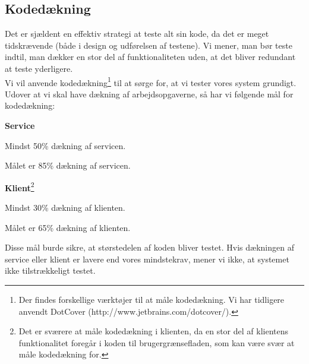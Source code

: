 \subsection{Kodedækning}
\label{Test_intendedStrat_coverage}
Det er sjældent en effektiv strategi at teste alt sin kode, da det er meget tidskrævende (både i design og udførelsen af testene). Vi mener, man bør teste indtil, man dækker en stor del af funktionaliteten uden, at det bliver redundant at teste yderligere. 
\\Vi vil anvende kodedækning\footnote{Der findes forskellige værktøjer til at måle kodedækning. Vi har tidligere anvendt DotCover (http://www.jetbrains.com/dotcover/).} til at sørge for, at vi tester vores system grundigt. Udover at vi skal have dækning af arbejdsopgaverne, så har vi følgende mål for kodedækning:
\begin{my_itemize}
\item \textbf{Service}
\item Mindst 50\% dækning af servicen.
\item Målet er 85\% dækning af servicen.
\item \textbf{Klient}\footnote{Det er sværere at måle kodedækning i klienten, da en stor del af klientens funktionalitet foregår i koden til brugergrænsefladen, som kan være svær at måle kodedækning for.}
\item Mindst 30\% dækning af klienten.
\item Målet er 65\% dækning af klienten. 
\end{my_itemize}

Disse mål burde sikre, at størstedelen af koden bliver testet. Hvis dækningen af service eller klient er lavere end vores mindstekrav, mener vi ikke, at systemet ikke tilstrækkeligt testet.